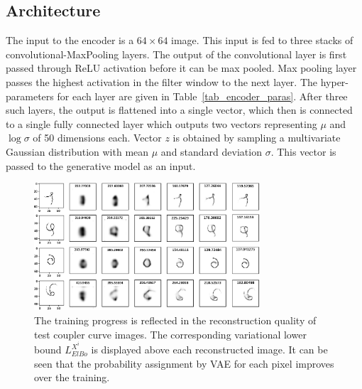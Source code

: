 \subsection{Architecture}
The input to the encoder is a $64\times64$ image. This input is fed to three stacks of convolutional-MaxPooling layers. The output of the convolutional layer is first passed through ReLU activation before it can be max pooled. Max pooling layer passes the highest activation in the filter window to the next layer. The hyper-parameters for each layer are given in Table~\ref{tab_encoder_paras}. After three such layers, the output is flattened into a single vector, which then is connected to a single fully connected layer which outputs two vectors representing $\mu$ and $\log\sigma$ of 50 dimensions each. Vector $z$ is obtained by sampling a multivariate Gaussian distribution with mean $\mu$ and standard deviation $\sigma$. This vector is passed to the generative model as an input.

\begin{figure}[t]
\centering
\includegraphics[width=0.75\textwidth]{idetc-20/figure/training_testing.eps}
  \caption{The training progress is reflected in the reconstruction quality of test coupler curve images. The corresponding variational lower bound $L_{ElBo}^{X^i}$ is displayed above each reconstructed image. It can be seen that the probability assignment by VAE for each pixel improves over the training.}
\label{fig_training_reconstructions}
\end{figure}

